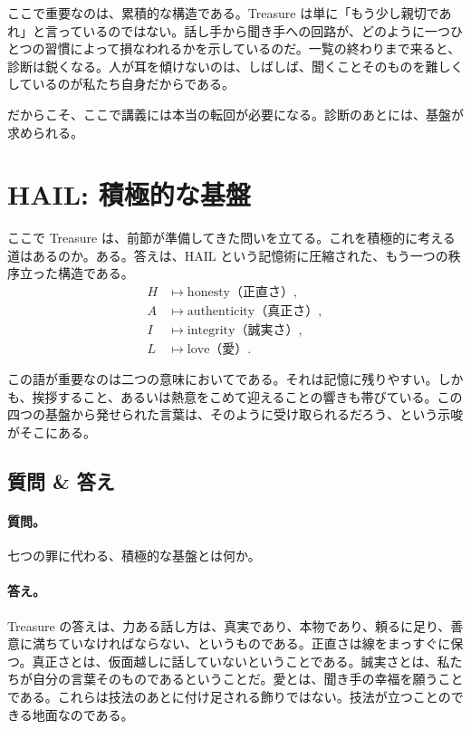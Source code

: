 ここで重要なのは、累積的な構造である。Treasure は単に「もう少し親切であれ」と言っているのではない。話し手から聞き手への回路が、どのように一つひとつの習慣によって損なわれるかを示しているのだ。一覧の終わりまで来ると、診断は鋭くなる。人が耳を傾けないのは、しばしば、聞くことそのものを難しくしているのが私たち自身だからである。

だからこそ、ここで講義には本当の転回が必要になる。診断のあとには、基盤が求められる。

\section{HAIL: 積極的な基盤}

ここで Treasure は、前節が準備してきた問いを立てる。これを積極的に考える道はあるのか。ある。答えは、\(\mathrm{HAIL}\) という記憶術に圧縮された、もう一つの秩序立った構造である。
\begin{align}
H &\mapsto \text{honesty（正直さ）},\\
A &\mapsto \text{authenticity（真正さ）},\\
I &\mapsto \text{integrity（誠実さ）},\\
L &\mapsto \text{love（愛）}.
\end{align}

この語が重要なのは二つの意味においてである。それは記憶に残りやすい。しかも、挨拶すること、あるいは熱意をこめて迎えることの響きも帯びている。この四つの基盤から発せられた言葉は、そのように受け取られるだろう、という示唆がそこにある。

\subsection{質問 \& 答え}

\paragraph{質問。} 七つの罪に代わる、積極的な基盤とは何か。

\paragraph{答え。} Treasure の答えは、力ある話し方は、真実であり、本物であり、頼るに足り、善意に満ちていなければならない、というものである。正直さは線をまっすぐに保つ。真正さとは、仮面越しに話していないということである。誠実さとは、私たちが自分の言葉そのものであるということだ。愛とは、聞き手の幸福を願うことである。これらは技法のあとに付け足される飾りではない。技法が立つことのできる地面なのである。

